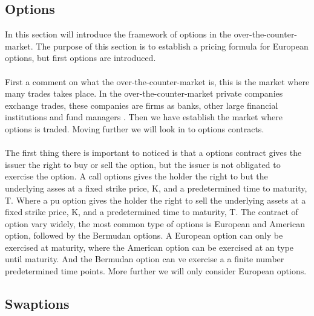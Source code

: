 \subsection{Options}
In this section will introduce the framework of options in the over-the-counter-market. 
The purpose of this section is to establish a pricing formula for European options, but first options are introduced.
\\\\
First a comment on what the over-the-counter-market is, this is the market where many trades takes place. 
In the over-the-counter-market private companies exchange trades, these companies are firms as banks, other 
large financial institutions and fund managers \cite{Hull}. Then we have establish the market where options is traded.
Moving further we will look in to options contracts. 
\\\\
The first thing there is important to noticed is that a options contract gives the issuer the right to 
buy or sell the option, but the issuer is not obligated to exercise the option. 
A call options gives the holder the right to but the underlying asses at a fixed strike price, K, and a 
predetermined time to maturity, T. Where a pu option gives the holder the right to sell the underlying assets at a fixed
strike price, K, and a predetermined time to maturity, T. The contract of option vary widely, the most common
type of options is European and American option, followed by the Bermudan options. A European option can only be
exercised at maturity, where the American option can be exercised at an type until maturity. And the Bermudan 
option can ve exercise a a finite number predetermined time points. More further we will only consider 
European options. 
\subsection{Swaptions}
